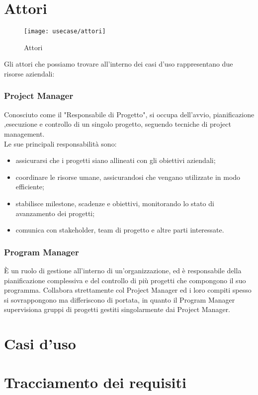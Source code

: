 \section{Attori}
\begin{figure}[H] 
    \centering 
    \texttt{[image: usecase/attori]} 
    \caption{Attori}
\end{figure}
Gli attori che possiamo trovare all'interno dei casi d'uso rappresentano due risorse aziendali:
\subsubsection*{Project Manager}
Conosciuto come il "Responsabile di Progetto", si occupa dell'avvio, pianificazione ,esecuzione e controllo di un singolo progetto, seguendo tecniche di project management.\\
Le sue principali responsabilità sono:
\begin{itemize}
\item assicurarsi che i progetti siano allineati con gli obiettivi aziendali;
\item coordinare le risorse umane, assicurandosi che vengano utilizzate in modo efficiente;
\item stabilisce milestone, scadenze e obiettivi, monitorando lo stato di avanzamento dei progetti;
\item comunica con stakeholder, team di progetto e altre parti interessate.
\end{itemize}
\subsubsection*{Program Manager}
È un ruolo di gestione all'interno di un'organizzazione, ed è responsabile della pianificazione complessiva e del controllo di più progetti che compongono il suo programma. Collabora strettamente col Project Manager ed i loro compiti spesso si sovrappongono ma differiscono di portata, in quanto il Program Manager supervisiona gruppi di progetti gestiti singolarmente dai Project Manager.

\section{Casi d'uso}











\section{Tracciamento dei requisiti}


 

